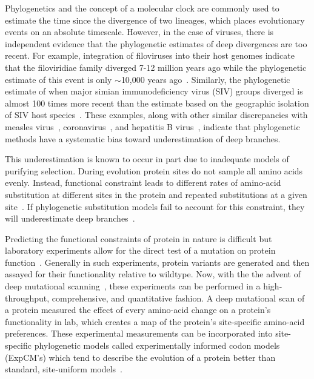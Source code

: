 \documentclass[11pt]{article}
\begin{document}
Phylogenetics and the concept of a molecular clock are commonly used to estimate the time since the divergence of two lineages, which places evolutionary events on an absolute timescale.
However, in the case of viruses, there is independent evidence that the phylogenetic estimates of deep divergences are too recent. 
For example, integration of filoviruses into their host genomes indicate that the filoviridiae family diverged 7-12 million years ago while the phylogenetic estimate of this event is only $\sim$10,000 years ago~\citep{carroll2013molecular, taylor2014evidence}.  
Similarly, the phylogenetic estimate of when major simian immunodeficiency virus (SIV) groups diverged is almost 100 times more recent than the estimate based on the geographic isolation of SIV host species~\citep{wertheim2009dating, worobey2010island}. 
These examples, along with other similar discrepancies with measles virus~\citep{furuse2010origin, rhazes1848treatise}, coronavirus~\citep{wertheim2013case}, and hepatitis B virus~\citep{fares2002revised}, indicate that phylogenetic methods have a systematic bias toward underestimation of deep branches. 

This underestimation is known to occur in part due to inadequate models of purifying selection. 
During evolution protein sites do not sample all amino acids evenly.  
Instead, functional constraint leads to different rates of amino-acid substitution at different sites in the protein and repeated substitutions at a given site~\citep{brown1982mitochondrial}. 
If phylogenetic substitution models fail to account for this constraint, they will underestimate deep branches~\citep{wertheim2011purifying, halpern1998evolutionary}. 

Predicting the functional constraints of protein in nature is difficult but laboratory experiments allow for the direct test of a mutation on protein function~\citep{dean2007mechanistic, harms2013evolutionary}. 
Generally in such experiments,  protein variants are generated and then assayed for their functionality relative to wildtype. 
Now, with the the advent of deep mutational scanning~\citep{fowler2014deep}, these experiments can be performed in a high-throughput, comprehensive, and quantitative fashion. 
A deep mutational scan of a protein measured the effect of every amino-acid change on a protein's functionality in lab, which creates a map of the protein's site-specific amino-acid preferences.
These experimental measurements can be incorporated into site-specific phylogenetic models called experimentally informed codon models (ExpCM's) which tend to describe the evolution of a protein better than standard, site-uniform models~\citep{bloom2014experimentally, hilton2017phydms, bloom2017identification, haddox2018mapping, lee2018deep, doud2015site}.
\end{document}
